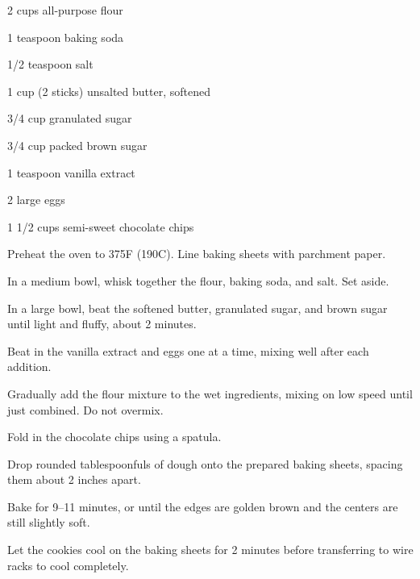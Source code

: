 \documentclass[
    language=english,
    doctype=recipe,
    institution=none,
]{../../omnilatex}
\begin{document}
\maketitle

\begin{ingredients}
    \item 2 cups all-purpose flour
    \item 1 teaspoon baking soda
    \item 1/2 teaspoon salt
    \item 1 cup (2 sticks) unsalted butter, softened
    \item 3/4 cup granulated sugar
    \item 3/4 cup packed brown sugar
    \item 1 teaspoon vanilla extract
    \item 2 large eggs
    \item 1 1/2 cups semi-sweet chocolate chips
\end{ingredients}

\begin{instructions}
    \item Preheat the oven to 375\textdegree F (190\textdegree C). Line baking sheets with parchment paper.
    \item In a medium bowl, whisk together the flour, baking soda, and salt. Set aside.
    \item In a large bowl, beat the softened butter, granulated sugar, and brown sugar until light and fluffy, about 2 minutes.
    \item Beat in the vanilla extract and eggs one at a time, mixing well after each addition.
    \item Gradually add the flour mixture to the wet ingredients, mixing on low speed until just combined. Do not overmix.
    \item Fold in the chocolate chips using a spatula.
    \item Drop rounded tablespoonfuls of dough onto the prepared baking sheets, spacing them about 2 inches apart.
    \item Bake for 9--11 minutes, or until the edges are golden brown and the centers are still slightly soft.
    \item Let the cookies cool on the baking sheets for 2 minutes before transferring to wire racks to cool completely.
\end{instructions}

\end{document}
